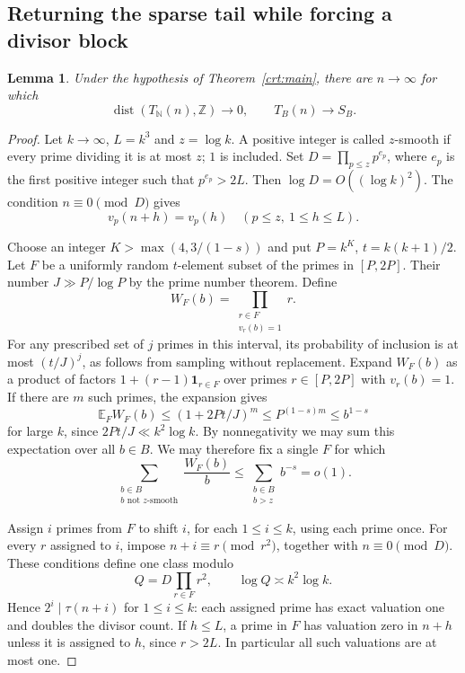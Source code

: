 \documentclass[11pt,letterpaper]{article}
\newtheorem{lemma}[theorem]{Lemma}
\newcommand{\Z}{\mathbb Z}
\newcommand{\N}{\mathbb N}
\newcommand{\E}{\mathbb E}
\newcommand{\ind}{\mathbf 1}
\newcommand{\dist}{\operatorname{dist}}
\begin{document}
\subsection{Returning the sparse tail while forcing a divisor block}
\begin{lemma}\label{crt:return}
Under the hypothesis of Theorem~\ref{crt:main}, there are $n\to\infty$ for which
\[
 \dist(T_{\N}(n),\Z)\longrightarrow0,\qquad T_B(n)\longrightarrow S_B.
\]
\end{lemma}
\begin{proof}
Let $k\to\infty$, $L=k^3$ and $z=\log k$. A positive integer is called $z$-smooth if every prime dividing it is at most $z$; $1$ is included. Set $D=\prod_{p\le z}p^{e_p}$, where $e_p$ is the first positive integer such that $p^{e_p}>2L$. Then $\log D=O((\log k)^2)$. The condition $n\equiv0\pmod D$ gives
\begin{equation}\label{crt:small}
 v_p(n+h)=v_p(h)\quad (p\le z,\ 1\le h\le L).
\end{equation}

Choose an integer $K>\max(4,3/(1-s))$ and put $P=k^K$, $t=k(k+1)/2$. Let $F$ be a uniformly random $t$-element subset of the primes in $[P,2P]$. Their number $J\gg P/\log P$ by the prime number theorem. Define
\[
 W_F(b)=\prod_{\substack{r\in F\\v_r(b)=1}}r .
\]
For any prescribed set of $j$ primes in this interval, its probability of inclusion is at most $(t/J)^j$, as follows from sampling without replacement. Expand $W_F(b)$ as a product of factors $1+(r-1)\ind_{r\in F}$ over primes $r\in[P,2P]$ with $v_r(b)=1$. If there are $m$ such primes, the expansion gives
\[
 \E_F W_F(b)\le (1+2Pt/J)^m\le P^{(1-s)m}\le b^{1-s}
\]
for large $k$, since $2Pt/J\ll k^2\log k$. By nonnegativity we may sum this expectation over all $b\in B$. We may therefore fix a single $F$ for which
\begin{equation}\label{crt:good}
 \sum_{\substack{b\in B\\b\text{ not }z\text{-smooth}}}\frac{W_F(b)}{b}
 \le \sum_{\substack{b\in B\\b>z}} b^{-s}=o(1).
\end{equation}

Assign $i$ primes from $F$ to shift $i$, for each $1\le i\le k$, using each prime once. For every $r$ assigned to $i$, impose $n+i\equiv r\pmod{r^2}$, together with $n\equiv0\pmod D$. These conditions define one class modulo
\[
 Q=D\prod_{r\in F}r^2,\qquad \log Q\asymp k^2\log k.
\]
Hence $2^i\mid\tau(n+i)$ for $1\le i\le k$: each assigned prime has exact valuation one and doubles the divisor count. If $h\le L$, a prime in $F$ has valuation zero in $n+h$ unless it is assigned to $h$, since $r>2L$. In particular all such valuations are at most one.


\end{proof}
\end{document}
